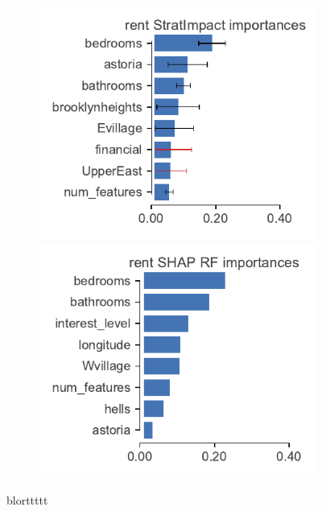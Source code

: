 \documentclass[11pt]{article}
\begin{document}
\begin{figure}
\begin{subfigure}{1\textwidth}
\vspace{-2mm}\vspace{3mm}
\end{subfigure}%
\hfill
\begin{subfigure}{1\textwidth}
    \centering
\includegraphics[scale=0.5]{images/rent-features.pdf}
\includegraphics[scale=0.5]{images/rent-features-shap-rf.pdf}
\vspace{-2mm}\vspace{3mm}
\end{subfigure}
\caption[short]{blorttttt}
\label{fig:features}
\end{figure}
\end{document}
